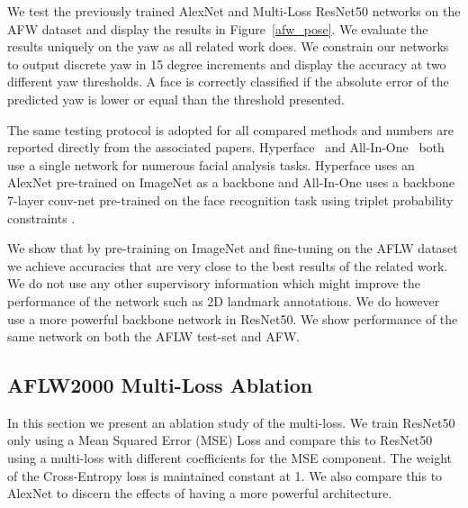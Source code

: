 \documentclass[10pt,twocolumn,letterpaper]{article}
\begin{document}
We test the previously trained AlexNet and Multi-Loss ResNet50 networks on the AFW dataset and display the results in Figure~\ref{afw_pose}. We evaluate the results uniquely on the yaw as all related work does. We constrain our networks to output discrete yaw in 15 degree increments and display the accuracy at two different yaw thresholds. A face is correctly classified if the absolute error of the predicted yaw is lower or equal than the threshold presented.

The same testing protocol is adopted for all compared methods and numbers are reported directly from the associated papers. Hyperface~\cite{ranjan2016hyperface} and All-In-One~\cite{allinone} both use a single network for numerous facial analysis tasks. Hyperface uses an AlexNet pre-trained on ImageNet as a backbone and All-In-One uses a backbone 7-layer conv-net pre-trained on the face recognition task using triplet probability constraints \cite{sankaranarayanan2016triplet}.

We show that by pre-training on ImageNet and fine-tuning on the AFLW dataset we achieve accuracies that are very close to the best results of the related work. We do not use any other supervisory information which might improve the performance of the network such as 2D landmark annotations. We do however use a more powerful backbone network in ResNet50. We show performance of the same network on both the AFLW test-set and AFW.

\begin{table}[]
\centering
{}
\caption{Mean average errors of predicted Euler angles in the AFLW test set.}
\label{AFLW}
\end{table}

\subsection{AFLW2000 Multi-Loss Ablation}\label{sec4-F}
In this section we present an ablation study of the multi-loss. We train ResNet50 only using a Mean Squared Error (MSE) Loss and compare this to ResNet50 using a multi-loss with different coefficients for the MSE component. The weight of the Cross-Entropy loss is maintained constant at 1. We also compare this to AlexNet to discern the effects of having a more powerful architecture.
\end{document}
